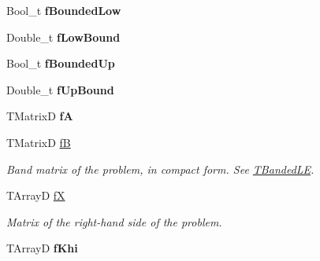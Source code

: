 \begin{DoxyCompactItemize}
\item 
\hypertarget{classTSplineFit_afbc075d838668e7ce8bfecfb153ea5f6}{
Bool\_\-t {\bfseries fBoundedLow}}
\label{classTSplineFit_afbc075d838668e7ce8bfecfb153ea5f6}

\item 
\hypertarget{classTSplineFit_a5dfb7057774bc058004ed785664f40f8}{
Double\_\-t {\bfseries fLowBound}}
\label{classTSplineFit_a5dfb7057774bc058004ed785664f40f8}

\item 
\hypertarget{classTSplineFit_a20fb0712e2b51b0fa72bab390792bfaf}{
Bool\_\-t {\bfseries fBoundedUp}}
\label{classTSplineFit_a20fb0712e2b51b0fa72bab390792bfaf}

\item 
\hypertarget{classTSplineFit_a66cbbce7f5f2e5a8a96acc8c95b20ba6}{
Double\_\-t {\bfseries fUpBound}}
\label{classTSplineFit_a66cbbce7f5f2e5a8a96acc8c95b20ba6}

\item 
\hypertarget{classTSplineFit_ad2f0cee2ccc20216a8e39d76374e85ab}{
TMatrixD {\bfseries fA}}
\label{classTSplineFit_ad2f0cee2ccc20216a8e39d76374e85ab}

\item 
\hypertarget{classTSplineFit_a848933d643f021983d8d033f366c508e}{
TMatrixD \hyperlink{classTSplineFit_a848933d643f021983d8d033f366c508e}{fB}}
\label{classTSplineFit_a848933d643f021983d8d033f366c508e}

\begin{DoxyCompactList}\small\item\em Band matrix of the problem, in compact form. See \hyperlink{classTBandedLE}{TBandedLE}. \item\end{DoxyCompactList}\item 
\hypertarget{classTSplineFit_aa5df41f7047cb1b994168ccbad938600}{
TArrayD \hyperlink{classTSplineFit_aa5df41f7047cb1b994168ccbad938600}{fX}}
\label{classTSplineFit_aa5df41f7047cb1b994168ccbad938600}

\begin{DoxyCompactList}\small\item\em Matrix of the right-\/hand side of the problem. \item\end{DoxyCompactList}\item 
\hypertarget{classTSplineFit_a12245d8c958ef8523eccbc00735e09d7}{
TArrayD {\bfseries fKhi}}
\label{classTSplineFit_a12245d8c958ef8523eccbc00735e09d7}


\end{DoxyCompactItemize}
